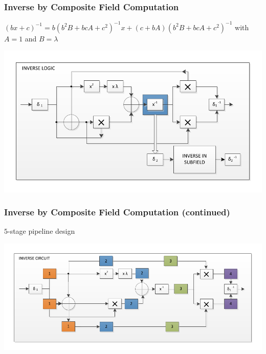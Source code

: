 \documentclass[handout]{beamer}
\begin{document}

\begin{frame}
	\frametitle{Inverse by Composite Field Computation}
	$(bx + c)^{-1} = b(b^2B + bcA + c^2)^{-1}x + (c + bA)(b^2B + bcA + c^2)^{-1}$ with $A = 1$ and $B = \lambda$
	\begin{center}
	\includegraphics[scale=.7]{./composite_field_inverter.pdf}
	\end{center}
\end{frame}

\begin{frame}
	\frametitle{Inverse by Composite Field Computation (continued)}
	$5$-stage pipeline design
	\begin{center}
	\includegraphics[scale=.7]{./composite_field_inverter_pipeline.pdf}
	\end{center}
\end{frame}
\end{document}
